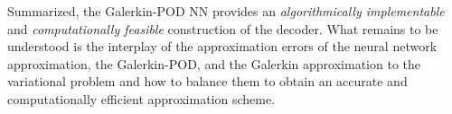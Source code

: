 Summarized, the Galerkin-POD NN provides an \emph{algorithmically implementable} and \emph{computationally feasible} construction of the decoder. What remains to be understood is the interplay of the approximation errors of the neural network approximation, the Galerkin-POD, and the Galerkin approximation to the variational problem and how to balance them to obtain an accurate and computationally efficient approximation scheme.